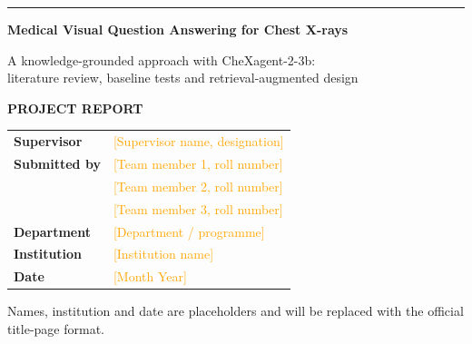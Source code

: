 \documentclass[11pt,a4paper]{article}
\newcommand{\placeholder}[1]{\textcolor{orange}{[#1]}}
\begin{document}
\begin{titlepage}
\thispagestyle{empty}
\vspace*{1.2cm}
{\color{teal}\rule{3.2cm}{3pt}}\par\vspace{0.8cm}
{\sffamily\bfseries\fontsize{26}{32}\selectfont\color{navy} Medical Visual Question Answering for Chest X-rays\par}
\vspace{0.5cm}
{\sffamily\large\color{midgrey} A knowledge-grounded approach with CheXagent-2-3b:\\ literature review, baseline tests and retrieval-augmented design\par}
\vspace{1.0cm}
{\sffamily\bfseries\large\color{navy} PROJECT REPORT\par}
\vspace{2.2cm}

\begin{tabular}{@{}p{4.2cm}p{9cm}@{}}
\textbf{Supervisor} & \placeholder{Supervisor name, designation} \\[1.1em]
\textbf{Submitted by} & \placeholder{Team member 1, roll number} \\
 & \placeholder{Team member 2, roll number} \\
 & \placeholder{Team member 3, roll number} \\[1.1em]
\textbf{Department} & \placeholder{Department / programme} \\[1.1em]
\textbf{Institution} & \placeholder{Institution name} \\[1.1em]
\textbf{Date} & \placeholder{Month Year} \\
\end{tabular}

\vfill
{\small\color{midgrey} Names, institution and date are placeholders and will be replaced with the official title-page format.\par}
\end{titlepage}

\end{document}
